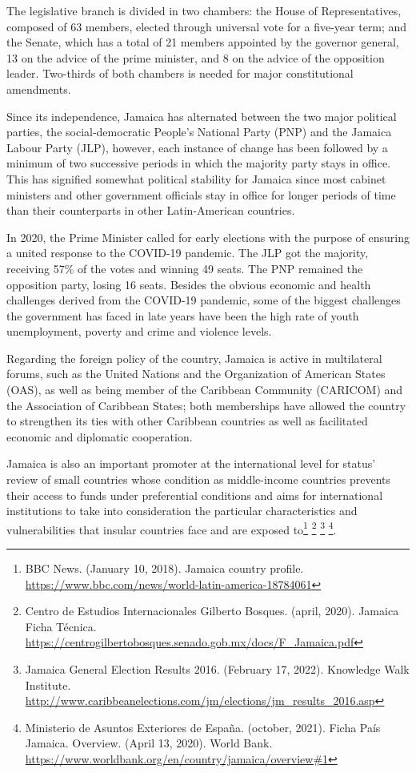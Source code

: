 \documentclass[
  10pt,
]{book}
\begin{document}
The legislative branch is divided in two chambers: the House of Representatives, composed of 63 members, elected through universal vote for a five-year term; and the Senate, which has a total of 21 members appointed by the governor general, 13 on the advice of the prime minister, and 8 on the advice of the opposition leader. Two-thirds of both chambers is needed for major constitutional amendments.

Since its independence, Jamaica has alternated between the two major political parties, the social-democratic People's National Party (PNP) and the Jamaica Labour Party (JLP), however, each instance of change has been followed by a minimum of two successive periods in which the majority party stays in office. This has signified somewhat political stability for Jamaica since most cabinet ministers and other government officials stay in office for longer periods of time than their counterparts in other Latin-American countries.

In 2020, the Prime Minister called for early elections with the purpose of ensuring a united response to the COVID-19 pandemic. The JLP got the majority, receiving 57\% of the votes and winning 49 seats. The PNP remained the opposition party, losing 16 seats. Besides the obvious economic and health challenges derived from the COVID-19 pandemic, some of the biggest challenges the government has faced in late years have been the high rate of youth unemployment, poverty and crime and violence levels.

Regarding the foreign policy of the country, Jamaica is active in multilateral forums, such as the United Nations and the Organization of American States (OAS), as well as being member of the Caribbean Community (CARICOM) and the Association of Caribbean States; both memberships have allowed the country to strengthen its ties with other Caribbean countries as well as facilitated economic and diplomatic cooperation.

Jamaica is also an important promoter at the international level for status' review of small countries whose condition as middle-income countries prevents their access to funds under preferential conditions and aims for international institutions to take into consideration the particular characteristics and vulnerabilities that insular countries face and are exposed to\footnote{BBC News. (January 10, 2018). Jamaica country profile. \url{https://www.bbc.com/news/world-latin-america-18784061}} \footnote{Centro de Estudios Internacionales Gilberto Bosques. (april, 2020). Jamaica Ficha Técnica. \url{https://centrogilbertobosques.senado.gob.mx/docs/F_Jamaica.pdf}} \footnote{Jamaica General Election Results 2016. (February 17, 2022). Knowledge Walk Institute. \url{http://www.caribbeanelections.com/jm/elections/jm_results_2016.asp}} \footnote{Ministerio de Asuntos Exteriores de España. (october, 2021). Ficha País Jamaica. Overview. (April 13, 2020). World Bank. \url{https://www.worldbank.org/en/country/jamaica/overview\#1}}.
\end{document}
